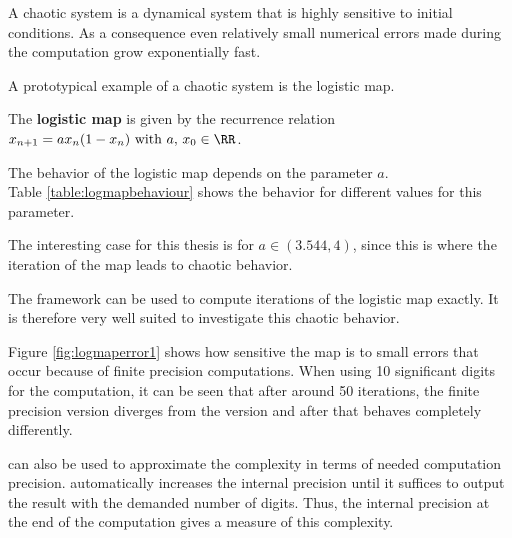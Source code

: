  A chaotic system is a dynamical system that is highly sensitive to initial conditions.
  As a consequence even relatively small numerical errors made during the computation grow exponentially fast.

  A prototypical example of a chaotic system is the logistic map.
  \begin{definition}\label{def:logmap}
    The \textbf{logistic map} is given by the recurrence relation 
    $ x_{n+1} = ax_n(1-x_n) \text{ with } a,\, x_0 \in \RR$.
  \end{definition} 
  The behavior of the logistic map depends on the parameter $a$.\\
  Table \ref{table:logmapbehaviour} shows the behavior for different values for this parameter.

  The interesting case for this thesis is for $a \in (3.544, 4)$, since this is  where the iteration of the map leads to chaotic behavior.

  The \irram framework can be used to compute iterations of the logistic map
  exactly.
  It is therefore very well suited to investigate this chaotic behavior.
  
  Figure \ref{fig:logmaperror1} shows how sensitive the map is to small errors
  that occur because of finite precision computations.
  When using 10 significant digits for the computation, it can be seen that
  after around 50 iterations, the finite precision version diverges from the
  \irram version and after that behaves completely differently. 

  \irram can also be used to approximate the complexity in terms of needed computation precision. 
  \irram automatically increases the internal precision until it suffices to output the result with the demanded number of digits.
  Thus, the internal precision at the end of the computation gives a measure of this complexity. 


